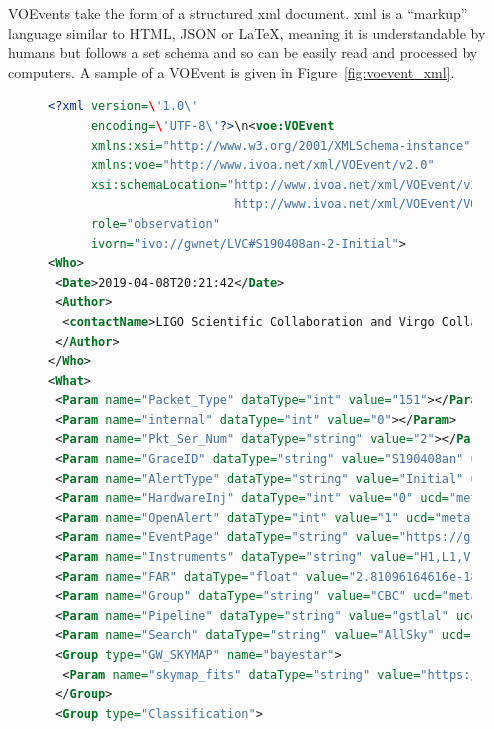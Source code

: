 \begin{colsection}
\begin{colsection}
VOEvents take the form of a structured \gls{xml} document. \gls{xml} is a ``markup'' language similar to HTML, JSON or \LaTeX, meaning it is understandable by humans but follows a set schema and so can be easily read and processed by computers. A sample of a VOEvent is given in Figure~\ref{fig:voevent_xml}.

\begin{figure}[p]
\begin{lstlisting}[language=xml,
       tabsize=2,
       breaklines=true,
       keywordstyle={},
       stringstyle=\color{red},
       showstringspaces=false,
       basicstyle=\scriptsize,
       emph={voe,Who,What,WhereWhen,How,Citations},
       emphstyle={\color{magenta}}
       ]
<?xml version=\'1.0\'
      encoding=\'UTF-8\'?>\n<voe:VOEvent
      xmlns:xsi="http://www.w3.org/2001/XMLSchema-instance"
      xmlns:voe="http://www.ivoa.net/xml/VOEvent/v2.0"
      xsi:schemaLocation="http://www.ivoa.net/xml/VOEvent/v2.0
                          http://www.ivoa.net/xml/VOEvent/VOEvent-v2.0.xsd"
      role="observation"
      ivorn="ivo://gwnet/LVC#S190408an-2-Initial">
<Who>
 <Date>2019-04-08T20:21:42</Date>
 <Author>
  <contactName>LIGO Scientific Collaboration and Virgo Collaboration</contactName>
 </Author>
</Who>
<What>
 <Param name="Packet_Type" dataType="int" value="151"></Param>
 <Param name="internal" dataType="int" value="0"></Param>
 <Param name="Pkt_Ser_Num" dataType="string" value="2"></Param>
 <Param name="GraceID" dataType="string" value="S190408an" ucd="meta.id"></Param>
 <Param name="AlertType" dataType="string" value="Initial" ucd="meta.version"></Param>
 <Param name="HardwareInj" dataType="int" value="0" ucd="meta.number"></Param>
 <Param name="OpenAlert" dataType="int" value="1" ucd="meta.number"></Param>
 <Param name="EventPage" dataType="string" value="https://gracedb.ligo.org/superevents/S190408an/view/" ucd="meta.ref.url"></Param>
 <Param name="Instruments" dataType="string" value="H1,L1,V1" ucd="meta.code"> </Param>
 <Param name="FAR" dataType="float" value="2.81096164616e-18" ucd="arith.rate;stat.falsealarm" unit="Hz"></Param>
 <Param name="Group" dataType="string" value="CBC" ucd="meta.code"></Param>
 <Param name="Pipeline" dataType="string" value="gstlal" ucd="meta.code"></Param>
 <Param name="Search" dataType="string" value="AllSky" ucd="meta.code"></Param>
 <Group type="GW_SKYMAP" name="bayestar">
  <Param name="skymap_fits" dataType="string" value="https://gracedb.ligo.org/api/superevents/S190408an/files/bayestar.fits.gz" ucd="meta.ref.url"></Param>
 </Group>
 <Group type="Classification">

\end{lstlisting}
\end{figure}
\end{colsection}
\end{colsection}
